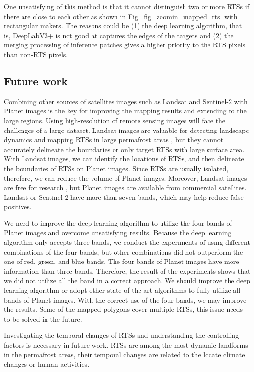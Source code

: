 \documentclass[preprint,12pt,authoryear]{elsarticle}
\begin{document}
One unsatisfying of this method is that it cannot distinguish two or more RTSs if there are close to each other as shown in Fig. \ref{fig_zoomin_mapped_rts} with rectangular makers. The reasons could be (1) the deep learning algorithm, that is, DeepLabV3+ is not good at captures the edges of the targets and (2) the merging processing of inference patches gives a higher priority to the RTS pixels than non-RTS pixels.

\subsection{Future work}
\label{subsec_future}

Combining other sources of satellites images such as Landsat and Sentinel-2 with Planet images is the key for improving the mapping results and extending to the large regions. Using high-resolution of remote sensing images will face the challenges of a large dataset. Landsat images are valuable for detecting landscape dynamics and mapping RTSs in large permafrost areas \citep{nitze_detection_2016, nitze_landsat-based_2017, nitze2018remote}, but they cannot accurately delineate the boundaries or only target RTSs with large surface area. With Landsat images, we can identify the locations of RTSs, and then delineate the boundaries of RTSs on Planet images. Since RTSs are usually isolated, therefore, we can reduce the volume of Planet images. Moreover, Landsat images are free for research \citep{zhu2019benefits}, but Planet images are available from commercial satellites. Landsat or Sentinel-2 have more than seven bands, which may help reduce false positives. 

We need to improve the deep learning algorithm to utilize the four bands of Planet images and overcome unsatisfying results. Because the deep learning algorithm only accepts three bands, we conduct the experiments of using different combinations of the four bands, but other combinations did not outperform the one of red, green, and blue bands. The four bands of Planet images have more information than three bands. Therefore, the result of the experiments shows that we did not utilize all the band in a correct approach. We should improve the deep learning algorithm or adopt other state-of-the-art algorithms to fully utilize all bands of Planet images. With the correct use of the four bands, we may improve the results. Some of the mapped polygons cover multiple RTSs, this issue needs to be solved in the future. 

Investigating the temporal changes of RTSs and understanding the controlling factors is necessary in future work. RTSs are among the most dynamic landforms in the permafrost areas, their temporal changes are related to the locate climate changes or human activities. 
\end{document}
